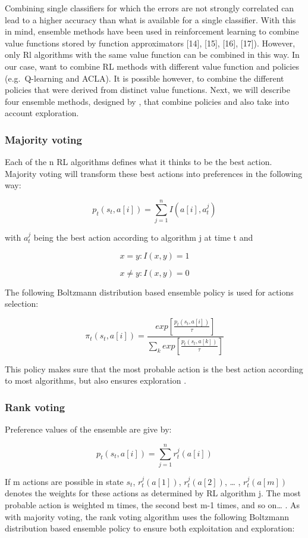 \documentclass[letterpaper]{article}
\begin{document}
Combining single classifiers for which the errors are not strongly
correlated can lead to a higher accuracy than what is available for a
single classifier. With this in mind, ensemble methods have been used in
reinforcement learning to combine value functions stored by function
approximators \cite{wiering2008} {[}14{]}, {[}15{]}, {[}16{]}, {[}17{]}).
However, only Rl algorithms with the same value function can be combined
in this way. In our case, want to combine RL methods with different
value function and policies (e.g.~Q-learning and ACLA). It is possible
however, to combine the different policies that were derived from
distinct value functions. Next, we will describe four ensemble methods,
designed by \cite{wiering2008}, that combine policies and also take into
account exploration.

\subsubsection{Majority voting}\label{majority-voting}

Each of the n RL algorithms defines what it thinks to be the best
action. Majority voting will transform these best actions into
preferences in the following way:

\[ p_t(s_t, a[i]) = \sum_{j=1}^{n} I(a[i],a_t^j) \]

with \(a_t^j\) being the best action according to algorithm j at time t
and

\[ x=y: I(x,y) = 1 \]

\[ x \neq y: I(x,y) = 0 \]

The following Boltzmann distribution based ensemble policy is used for
actions selection:

\[ \pi_t (s_t, a[i]) = \frac{exp[\frac{p_t(s_t, a[i])}{\tau}]}{\sum_k exp[\frac{p_t(s_t, a[k])}{\tau}]} \]

This policy makes sure that the most probable action is the best action
according to most algorithms, but also ensures exploration \cite{wiering2008}.

\subsubsection{Rank voting}\label{rank-voting}

Preference values of the ensemble are give by:

\[ p_t(s_t, a[i]) = \sum_{j=1}^{n} r_t^j(a[i]) \]

If m actions are possible in state \(s_t\), \(r_t^j(a[1])\),
\(r_t^j(a[2])\), \ldots{} , \(r_t^j(a[m])\) denotes the weights for
these actions as determined by RL algorithm j. The most probable action
is weighted m times, the second best m-1 times, and so on\ldots{}
\cite{wiering2008}. As with majority voting, the rank voting algorithm uses
the following Boltzmann distribution based ensemble policy to ensure
both exploitation and exploration:
\end{document}
